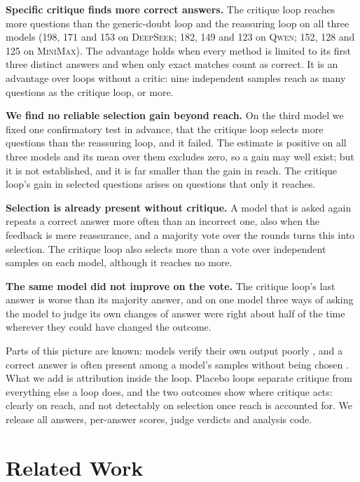 \documentclass[11pt]{article}
\newcommand{\ds}{\textsc{DeepSeek}}
\newcommand{\qw}{\textsc{Qwen}}
\newcommand{\mm}{\textsc{MiniMax}}
\begin{document}
\textbf{Specific critique finds more correct answers.}
The critique loop reaches more questions than the generic-doubt loop and the reassuring loop on all three models (198, 171 and 153 on \ds; 182, 149 and 123 on \qw; 152, 128 and 125 on \mm).
The advantage holds when every method is limited to its first three distinct answers and when only exact matches count as correct.
It is an advantage over loops without a critic: nine independent samples reach as many questions as the critique loop, or more.

\textbf{We find no reliable selection gain beyond reach.}
On the third model we fixed one confirmatory test in advance, that the critique loop selects more questions than the reassuring loop, and it failed.
The estimate is positive on all three models and its mean over them excludes zero, so a gain may well exist; but it is not established, and it is far smaller than the gain in reach.
The critique loop's gain in selected questions arises on questions that only it reaches.

\textbf{Selection is already present without critique.}
A model that is asked again repeats a correct answer more often than an incorrect one, also when the feedback is mere reassurance, and a majority vote over the rounds turns this into selection.
The critique loop also selects more than a vote over independent samples on each model, although it reaches no more.

\textbf{The same model did not improve on the vote.}
The critique loop's last answer is worse than its majority answer, and on one model three ways of asking the model to judge its own changes of answer were right about half of the time wherever they could have changed the outcome.

Parts of this picture are known: models verify their own output poorly \citep{huang2024cannot,stechly2024selfverification,song2024mindgap}, and a correct answer is often present among a model's samples without being chosen \citep{brown2024monkeys,jain2026cliff}.
What we add is attribution inside the loop.
Placebo loops separate critique from everything else a loop does, and the two outcomes show where critique acts: clearly on reach, and not detectably on selection once reach is accounted for.
We release all answers, per-answer scores, judge verdicts and analysis code.

\section{Related Work}
\end{document}
